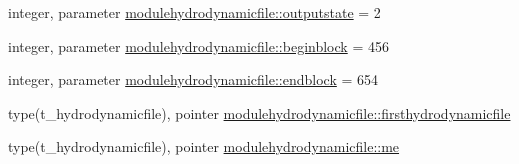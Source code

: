 \begin{DoxyCompactItemize}
\item 
integer, parameter \mbox{\hyperlink{namespacemodulehydrodynamicfile_abe4ae37433a4315c9986ad89795f175d}{modulehydrodynamicfile\+::outputstate}} = 2
\item 
integer, parameter \mbox{\hyperlink{namespacemodulehydrodynamicfile_aa9a0102373e2ba53486502369dce4f77}{modulehydrodynamicfile\+::beginblock}} = 456
\item 
integer, parameter \mbox{\hyperlink{namespacemodulehydrodynamicfile_a09579531077fde3aa1c2e499c84a99de}{modulehydrodynamicfile\+::endblock}} = 654
\item 
type(t\+\_\+hydrodynamicfile), pointer \mbox{\hyperlink{namespacemodulehydrodynamicfile_a19fd9db203a8d9b66d8a7b7bca53f69e}{modulehydrodynamicfile\+::firsthydrodynamicfile}}
\item 
type(t\+\_\+hydrodynamicfile), pointer \mbox{\hyperlink{namespacemodulehydrodynamicfile_a4456fc1410cb6837e54a8073a1e664e0}{modulehydrodynamicfile\+::me}}
\end{DoxyCompactItemize}
